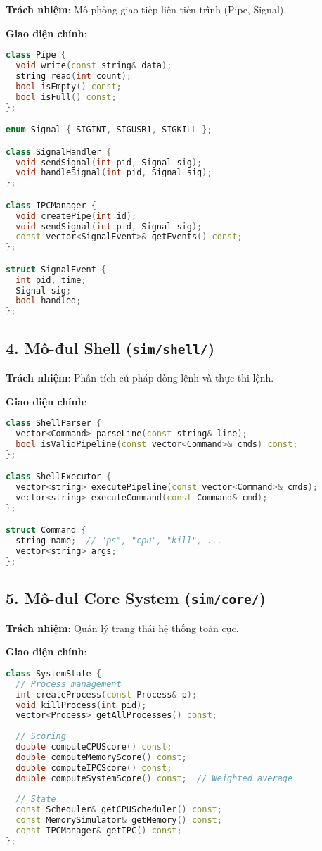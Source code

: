 \textbf{Trách nhiệm}: Mô phỏng giao tiếp liên tiến trình (Pipe, Signal).

\textbf{Giao diện chính}:
\begin{lstlisting}[language=C++,caption={IPC API}]
class Pipe {
  void write(const string& data);
  string read(int count);
  bool isEmpty() const;
  bool isFull() const;
};

enum Signal { SIGINT, SIGUSR1, SIGKILL };

class SignalHandler {
  void sendSignal(int pid, Signal sig);
  void handleSignal(int pid, Signal sig);
};

class IPCManager {
  void createPipe(int id);
  void sendSignal(int pid, Signal sig);
  const vector<SignalEvent>& getEvents() const;
};

struct SignalEvent {
  int pid, time;
  Signal sig;
  bool handled;
};
\end{lstlisting}

\subsection{4. Mô-đul Shell (\texttt{sim/shell/})}

\textbf{Trách nhiệm}: Phân tích cú pháp dòng lệnh và thực thi lệnh.

\textbf{Giao diện chính}:
\begin{lstlisting}[language=C++,caption={Shell API}]
class ShellParser {
  vector<Command> parseLine(const string& line);
  bool isValidPipeline(const vector<Command>& cmds) const;
};

class ShellExecutor {
  vector<string> executePipeline(const vector<Command>& cmds);
  vector<string> executeCommand(const Command& cmd);
};

struct Command {
  string name;  // "ps", "cpu", "kill", ...
  vector<string> args;
};
\end{lstlisting}

\subsection{5. Mô-đul Core System (\texttt{sim/core/})}

\textbf{Trách nhiệm}: Quản lý trạng thái hệ thống toàn cục.

\textbf{Giao diện chính}:
\begin{lstlisting}[language=C++,caption={Core System API}]
class SystemState {
  // Process management
  int createProcess(const Process& p);
  void killProcess(int pid);
  vector<Process> getAllProcesses() const;
  
  // Scoring
  double computeCPUScore() const;
  double computeMemoryScore() const;
  double computeIPCScore() const;
  double computeSystemScore() const;  // Weighted average
  
  // State
  const Scheduler& getCPUScheduler() const;
  const MemorySimulator& getMemory() const;
  const IPCManager& getIPC() const;
};
\end{lstlisting}

